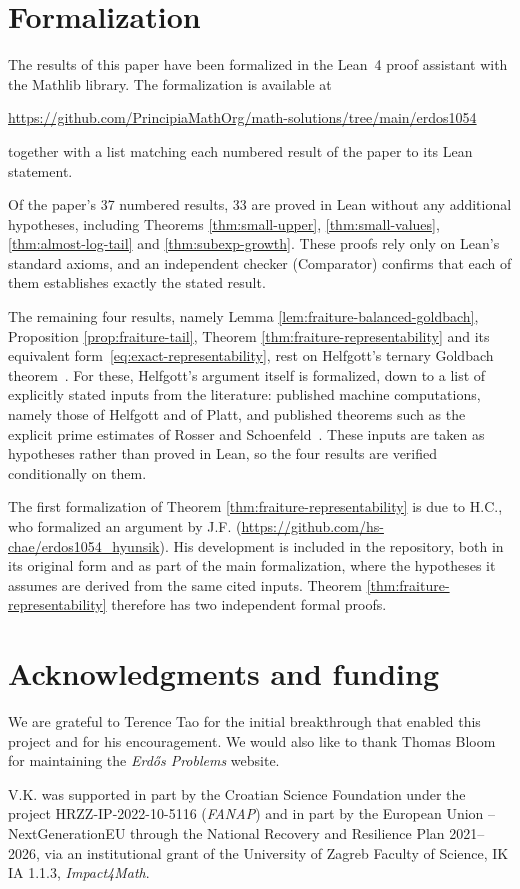 \documentclass[11pt,letterpaper,reqno]{amsart}
\numberwithin{equation}{section}
\theoremstyle{remark}
\begin{document}

\section*{Formalization}

The results of this paper have been formalized in the Lean~4 proof assistant
with the Mathlib library. The formalization is available at
\begin{center}
\url{https://github.com/PrincipiaMathOrg/math-solutions/tree/main/erdos1054}
\end{center}
together with a list matching each numbered result of the paper to its Lean
statement.

Of the paper's 37 numbered results, 33 are proved in Lean without any
additional hypotheses, including Theorems \ref{thm:small-upper},
\ref{thm:small-values}, \ref{thm:almost-log-tail} and \ref{thm:subexp-growth}.
These proofs rely only on Lean's standard axioms, and an independent checker
(Comparator) confirms that each of them establishes exactly the stated result.

The remaining four results, namely Lemma \ref{lem:fraiture-balanced-goldbach},
Proposition \ref{prop:fraiture-tail}, Theorem \ref{thm:fraiture-representability}
and its equivalent form~\eqref{eq:exact-representability}, rest on Helfgott's
ternary Goldbach theorem~\cite{Helfgott}. For these, Helfgott's argument itself
is formalized, down to a list of explicitly stated inputs from the literature:
published machine computations, namely those of Helfgott and of Platt, and
published theorems such as the explicit prime estimates of Rosser and
Schoenfeld~\cite{RosserSchoenfeld}. These inputs are taken as hypotheses rather
than proved in Lean, so the four results are verified conditionally on them.

The first formalization of Theorem \ref{thm:fraiture-representability} is due to
H.C., who formalized an argument by J.F.
(\url{https://github.com/hs-chae/erdos1054_hyunsik}). His development is included
in the repository, both in its original form and as part of the main
formalization, where the hypotheses it assumes are derived from the same cited
inputs. Theorem \ref{thm:fraiture-representability} therefore has two independent
formal proofs.


\section*{Acknowledgments and funding}
We are grateful to Terence Tao for the initial breakthrough that enabled this project and for his encouragement. We would also like to thank Thomas Bloom for maintaining the \emph{Erd\H{o}s Problems} website.

V.K. was supported in part by the Croatian Science Foundation under the project HRZZ-IP-2022-10-5116 (\emph{FANAP}) and in part by the European Union -- NextGenerationEU through the National Recovery and Resilience Plan 2021--2026, via an institutional grant of the University of Zagreb Faculty of Science, IK IA 1.1.3, \emph{Impact4Math}.




\end{document}
